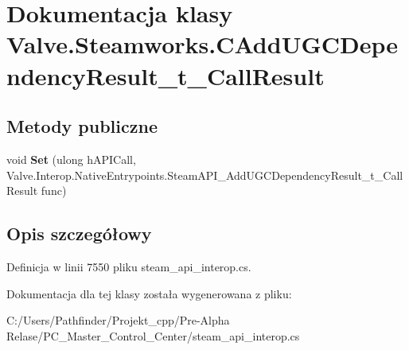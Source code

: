 \hypertarget{class_valve_1_1_steamworks_1_1_c_add_u_g_c_dependency_result__t___call_result}{}\section{Dokumentacja klasy Valve.\+Steamworks.\+C\+Add\+U\+G\+C\+Dependency\+Result\+\_\+t\+\_\+\+Call\+Result}
\label{class_valve_1_1_steamworks_1_1_c_add_u_g_c_dependency_result__t___call_result}
\subsection*{Metody publiczne}
\begin{DoxyCompactItemize}
\item 
\mbox{\label{class_valve_1_1_steamworks_1_1_c_add_u_g_c_dependency_result__t___call_result_a4d417e9a3c51218a8067005a7a2a0a27}} 
void {\bfseries Set} (ulong h\+A\+P\+I\+Call, Valve.\+Interop.\+Native\+Entrypoints.\+Steam\+A\+P\+I\+\_\+\+Add\+U\+G\+C\+Dependency\+Result\+\_\+t\+\_\+\+Call\+Result func)
\end{DoxyCompactItemize}


\subsection{Opis szczegółowy}


Definicja w linii 7550 pliku steam\+\_\+api\+\_\+interop.\+cs.



Dokumentacja dla tej klasy została wygenerowana z pliku\+:\begin{DoxyCompactItemize}
\item 
C\+:/\+Users/\+Pathfinder/\+Projekt\+\_\+cpp/\+Pre-\/\+Alpha Relase/\+P\+C\+\_\+\+Master\+\_\+\+Control\+\_\+\+Center/steam\+\_\+api\+\_\+interop.\+cs\end{DoxyCompactItemize}
